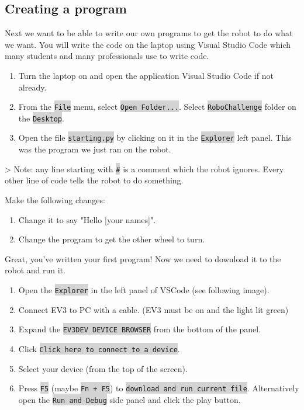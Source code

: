 \documentclass[12pt,a4paper]{article}
\newcommand{\code}[1]{\colorbox{lightgray}{\texttt{#1}}}
\begin{document}
\subsection{ Creating a program}
Next we want to be able to write our own programs to get the robot to do what we want. You will write the code on the laptop using Visual Studio Code which many students and many professionals use to write code.

\begin{enumerate}
    \item Turn the laptop on and open the application Visual Studio Code if not already.
    \item From the \code{File} menu, select \code{Open Folder...}. Select \code{RoboChallenge} folder on the \code{Desktop}.
    \item Open the file \code{starting.py} by clicking on it in the \code{Explorer} left panel. This was the program we just ran on the robot.
\end{enumerate}


> Note: any line starting with \code{\#} is a comment which the robot ignores. Every other line of code tells the robot to do something.

Make the following changes:
\begin{enumerate}
    \item Change it to say "Hello [your names]". 
    \item Change the program to get the other wheel to turn. 
\end{enumerate}
Great, you've written your first program! Now we need to download it to the robot and run it.

\begin{enumerate}
    \item Open the \code{Explorer} in the left panel of VSCode (see following image). 
    \item Connect EV3 to PC with a cable. (EV3 must be on and the light lit green) 
    \item Expand the \code{EV3DEV DEVICE BROWSER} from the bottom of the panel. 
    \item Click \code{Click here to connect to a device}. 
    \item Select your device (from the top of the screen). 
    \item Press \code{F5} (maybe \code{Fn + F5}) to \code{download and run current file}. Alternatively open the \code{Run and Debug} side panel and click the play button. 
\end{enumerate}
\end{document}

